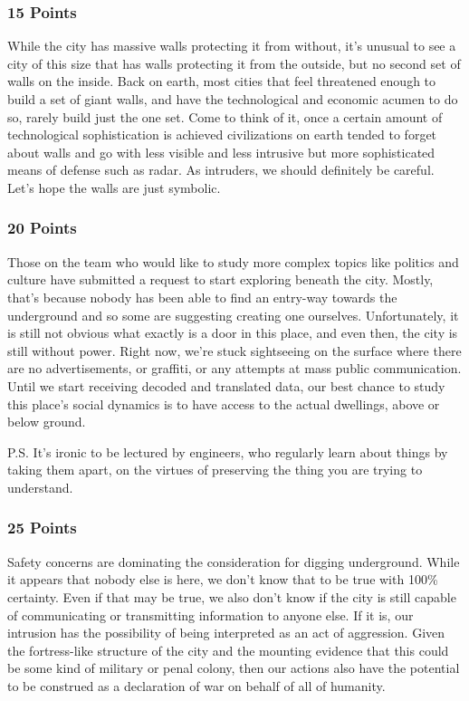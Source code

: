 \documentclass[conference]{IEEEtran}
\begin{document}
\subsubsection*{15 Points}
While the city has massive walls protecting it from without, it’s unusual to see a city of this size that has walls protecting it from the outside, but no second set of walls on the inside. Back on earth, most cities that feel threatened enough to build a set of giant walls, and have the technological and economic acumen to do so, rarely build just the one set. Come to think of it, once a certain amount of technological sophistication is achieved civilizations on earth tended to forget about walls and go with less visible and less intrusive but more sophisticated means of defense such as radar. As intruders, we should definitely be careful. Let’s hope the walls are just symbolic.

\subsubsection*{20 Points}
Those on the team who would like to study more complex topics like politics and culture have submitted a request to start exploring beneath the city. Mostly, that’s because nobody has been able to find an entry-way towards the underground and so some are suggesting creating one ourselves. Unfortunately, it is still not obvious what exactly is a door in this place, and even then, the city is still without power. Right now, we’re stuck sightseeing on the surface where there are no advertisements, or graffiti, or any attempts at mass public communication. Until we start receiving decoded and translated data, our best chance to study this place’s social dynamics is to have access to the actual dwellings, above or below ground.

P.S. It’s ironic to be lectured by engineers, who regularly learn about things by taking them apart, on the virtues of preserving the thing you are trying to understand.

\subsubsection*{25 Points}
Safety concerns are dominating the consideration for digging underground. While it appears that nobody else is here, we don’t know that to be true with 100\% certainty. Even if that may be true, we also don’t know if the city is still capable of communicating or transmitting information to anyone else. If it is, our intrusion has the possibility of being interpreted as an act of aggression. Given the fortress-like structure of the city and the mounting evidence that this could be some kind of military or penal colony, then our actions also have the potential to be construed as a declaration of war on behalf of all of humanity. 
\end{document}
